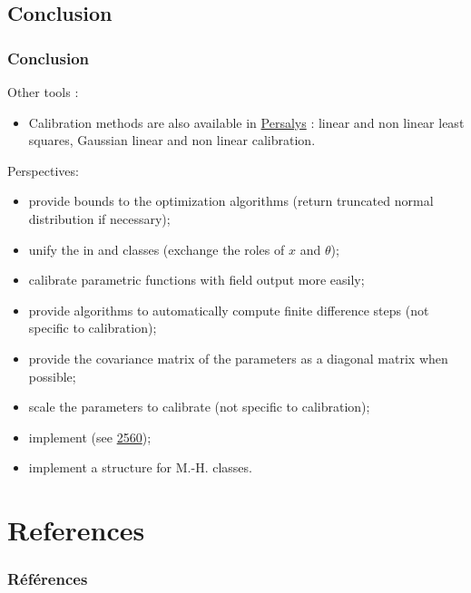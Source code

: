 \documentclass[9pt]{beamer}
\begin{document}
\begin{frame}[fragile]
\section{Conclusion}
\frametitle{Conclusion}

Other tools :
\begin{itemize}
\item Calibration methods are also available in \href{https://persalys.fr}{Persalys} : linear and non linear least squares, Gaussian linear and non linear calibration.
\end{itemize}

Perspectives:
\begin{itemize}
\item provide bounds to the optimization algorithms (return truncated normal distribution if necessary);
\item unify the  in  and  classes (exchange the roles of $x$ and $\theta$);
\item calibrate parametric functions with field output more easily;
\item provide algorithms to automatically compute finite difference steps (not specific to calibration);
\item provide the covariance matrix of the parameters as a diagonal matrix when possible;
\item scale the parameters to calibrate (not specific to calibration);
\item implement  (see \href{https://github.com/openturns/openturns/issues/2560}{2560});
\item implement a  structure for M.-H. classes.
\end{itemize}
\end{frame}




\section{References}
\begin{frame}[allowframebreaks]
\frametitle{Références}
\nocite{*}


\end{frame}
\end{document}
